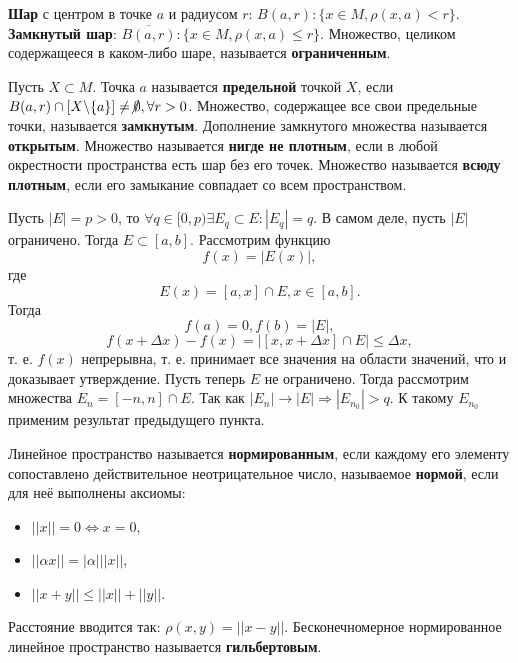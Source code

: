 \documentclass[11pt]{article}
\begin{document}
\textbf{Шар} с центром в точке $a$ и радиусом $r$: $B(a, r): \{x \in M, \rho(x, a) < r\}$.
\textbf{Замкнутый шар}: $\overline{B(a, r)}: \{x \in M, \rho(x, a) \leq r\}$. Множество,
целиком содержащееся в каком-либо шаре, называется \textbf{ограниченным}.

Пусть $X \subset M$. Точка $a$ называется \textbf{предельной} точкой $X$, если
$B(a, r) \cap [X \backslash \{a\}] \neq \not\emptyset, \forall r > 0$. Множество, содержащее
все свои предельные точки, называется \textbf{замкнутым}. Дополнение замкнутого множества
называется \textbf{открытым}. Множество называется \textbf{нигде не плотным}, если в любой
окрестности пространства есть шар без его точек. Множество называется \textbf{всюду плотным},
если его замыкание совпадает со всем пространством.

Пусть $|E| = p > 0$, то $\forall q \in [0, p) \exists E_q \subset E: |E_q| = q$. В самом деле,
пусть $|E|$ ограничено. Тогда $E \subset [a, b]$. Рассмотрим функцию
\begin{equation}
f(x) = |E(x)|,
\end{equation}
где
\begin{equation}
E(x) = [a, x] \cap E, x \in [a, b].
\end{equation}
Тогда
\begin{equation}
f(a) = 0, f(b) = |E|,
\end{equation}
\begin{equation}
f(x + \Delta x) - f(x) = |[x, x + \Delta x] \cap E| \leq \Delta x,
\end{equation}
т. е. $f(x)$ непрерывна, т. е. принимает все значения на области значений, что и доказывает
утверждение. Пусть теперь $E$ не ограничено. Тогда рассмотрим множества $E_n = [-n, n] \cap E$.
Так как $|E_n| \to |E| \Rightarrow |E_{n_0}| > q$. К такому $E_{n_0}$ применим результат
предыдущего пункта.

Линейное пространство называется \textbf{нормированным}, если каждому его элементу сопоставлено
действительное неотрицательное число, называемое \textbf{нормой}, если для неё выполнены аксиомы:
\begin{itemize}
\item $||x|| = 0 \Leftrightarrow x = 0$,
\item $||\alpha x|| = |\alpha|||x||$,
\item $||x + y|| \leq ||x|| + ||y||$.
\end{itemize}
Расстояние вводится так: $\rho(x, y) = ||x - y||$. Бесконечномерное нормированное линейное
пространство называется \textbf{гильбертовым}.
\end{document}

